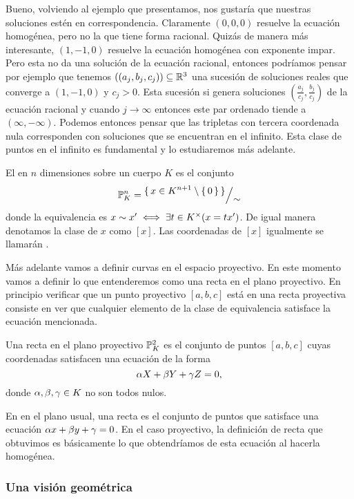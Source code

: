 \documentclass[12pt]{memoir}
\begin{document}
Bueno, volviendo al ejemplo que presentamos, nos gustaría que nuestras soluciones estén en correspondencia. Claramente $(0,0,0)$ resuelve la ecuación homogénea, pero no la que tiene forma racional. Quizás de manera más interesante, $(1,-1,0)$ resuelve la ecuación homogénea con exponente impar. Pero esta no da una solución de la ecuación racional, entonces podríamos pensar por ejemplo que tenemos $((a_j,b_j,c_j))\subseteq\mathbb{R}^3$ una sucesión de soluciones reales que converge a $(1,-1,0)$ y $c_j>0$. Esta sucesión si genera soluciones $\left(\frac{a_j}{c_j},\frac{b_j}{c_j}\right)$ de la ecuación racional y cuando $j\to\infty$ entonces este par ordenado tiende a $(\infty,-\infty)$. Podemos entonces pensar que las tripletas con tercera coordenada nula corresponden con soluciones que se encuentran en el infinito. Esta clase de puntos en el infinito es fundamental y lo estudiaremos más adelante.

\begin{Def}
  El  en $n$ dimensiones sobre un cuerpo $K$ es el conjunto
  $$\bP^n_K=\quot{\set{x\in K^{n+1}\less\set{0}}}{\sim}$$
  donde la equivalencia es $x\sim x'\iff \exists t\in K^\times(x=tx')$. De igual manera denotamos la clase de $x$ como $[x]$. Las coordenadas de $[x]$ igualmente se llamarán .
\end{Def}

Más adelante vamos a definir curvas en el espacio proyectivo. En este momento vamos a definir lo que entenderemos como una recta en el plano proyectivo. En principio verificar que un punto proyectivo $[a,b,c]$ está en una recta proyectiva consiste en ver que cualquier elemento de la clase de equivalencia satisface la ecuación mencionada.

\begin{Def}
  Una recta en el plano proyectivo $\mathbb{P}^2_K$ es el conjunto de puntos $[a,b,c]$ cuyas coordenadas satisfacen una ecuación de la forma
  $$\alpha X+\beta Y+\gamma Z=0,$$
  donde $\alpha,\beta,\gamma\in K$ no son todos nulos.
\end{Def}

En en el plano usual, una recta es el conjunto de puntos que satisface una ecuación $\alpha x+\beta y+\gamma=0$. En el caso proyectivo, la definición de recta que obtuvimos es básicamente lo que obtendríamos de esta ecuación al hacerla homogénea.

\subsubsection{Una visión geométrica}
\end{document}

